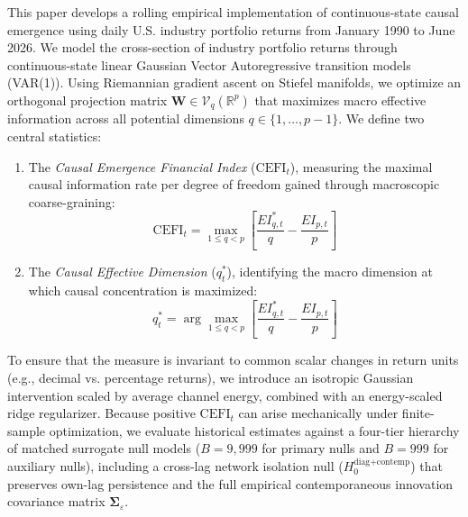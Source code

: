 \documentclass[review,12pt,authoryear]{elsarticle}
\begin{document}
This paper develops a rolling empirical implementation of continuous-state causal emergence using daily U.S. industry portfolio returns from January 1990 to June 2026. We model the cross-section of industry portfolio returns through continuous-state linear Gaussian Vector Autoregressive transition models (VAR(1)). Using Riemannian gradient ascent on Stiefel manifolds, we optimize an orthogonal projection matrix $\mathbf{W} \in \mathcal{V}_q(\mathbb{R}^p)$ that maximizes macro effective information across all potential dimensions $q \in \{1, \dots, p-1\}$. We define two central statistics:
\begin{enumerate}[label=(\roman*)]
    \item The \emph{Causal Emergence Financial Index} ($\mathrm{CEFI}_t$), measuring the maximal causal information rate per degree of freedom gained through macroscopic coarse-graining:
    \begin{equation}
    \mathrm{CEFI}_t = \max_{1 \le q < p} \left[ \frac{EI_{q,t}^*}{q} - \frac{EI_{p,t}}{p} \right]
    \end{equation}
    \item The \emph{Causal Effective Dimension} ($q_t^*$), identifying the macro dimension at which causal concentration is maximized:
    \begin{equation}
    q_t^* = \arg\max_{1 \le q < p} \left[ \frac{EI_{q,t}^*}{q} - \frac{EI_{p,t}}{p} \right]
    \end{equation}
\end{enumerate}

To ensure that the measure is invariant to common scalar changes in return units (e.g., decimal vs. percentage returns), we introduce an isotropic Gaussian intervention scaled by average channel energy, combined with an energy-scaled ridge regularizer. Because positive $\mathrm{CEFI}_t$ can arise mechanically under finite-sample optimization, we evaluate historical estimates against a four-tier hierarchy of matched surrogate null models ($B=9,999$ for primary nulls and $B=999$ for auxiliary nulls), including a cross-lag network isolation null ($H_0^{\text{diag+contemp}}$) that preserves own-lag persistence and the full empirical contemporaneous innovation covariance matrix $\boldsymbol{\Sigma}_\varepsilon$.
\end{document}
